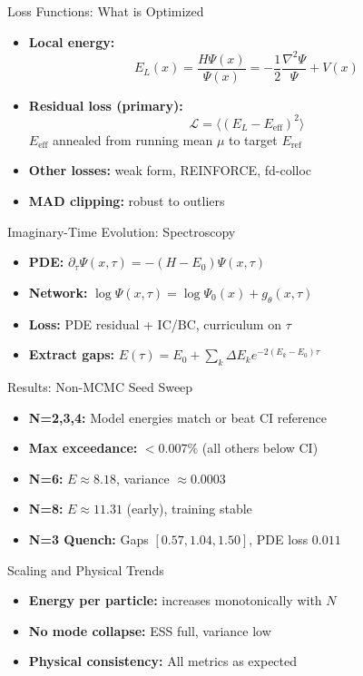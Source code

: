 \documentclass{beamer}
\begin{document}
\begin{frame}{Loss Functions: What is Optimized}
\begin{itemize}
  \item \textbf{Local energy:}
    \[ E_L(x) = \frac{H\Psi(x)}{\Psi(x)} = -\frac{1}{2}\frac{\nabla^2 \Psi}{\Psi} + V(x) \]
  \item \textbf{Residual loss (primary):}
    \[ \mathcal{L} = \langle (E_L - E_{\mathrm{eff}})^2 \rangle \]
    $E_{\mathrm{eff}}$ annealed from running mean $\mu$ to target $E_{\mathrm{ref}}$
  \item \textbf{Other losses:} weak form, REINFORCE, fd-colloc
  \item \textbf{MAD clipping:} robust to outliers
\end{itemize}
\end{frame}

\begin{frame}{Imaginary-Time Evolution: Spectroscopy}
\begin{itemize}
  \item \textbf{PDE:} $\partial_\tau \Psi(x,\tau) = -(H-E_0)\Psi(x,\tau)$
  \item \textbf{Network:} $\log\Psi(x,\tau) = \log\Psi_0(x) + g_\theta(x,\tau)$
  \item \textbf{Loss:} PDE residual + IC/BC, curriculum on $\tau$
  \item \textbf{Extract gaps:} $E(\tau) = E_0 + \sum_k \Delta E_k e^{-2(E_k-E_0)\tau}$
\end{itemize}
\end{frame}

\begin{frame}{Results: Non-MCMC Seed Sweep}
\begin{itemize}
  \item \textbf{N=2,3,4:} Model energies match or beat CI reference
  \item \textbf{Max exceedance:} $<0.007\%$ (all others below CI)
  \item \textbf{N=6:} $E \approx 8.18$, variance $\approx 0.0003$
  \item \textbf{N=8:} $E \approx 11.31$ (early), training stable
  \item \textbf{N=3 Quench:} Gaps $[0.57, 1.04, 1.50]$, PDE loss $0.011$
\end{itemize}
\end{frame}

\begin{frame}{Scaling and Physical Trends}
\begin{itemize}
  \item \textbf{Energy per particle:} increases monotonically with $N$
  \item \textbf{No mode collapse:} ESS full, variance low
  \item \textbf{Physical consistency:} All metrics as expected
\end{itemize}
\end{frame}
\end{document}

